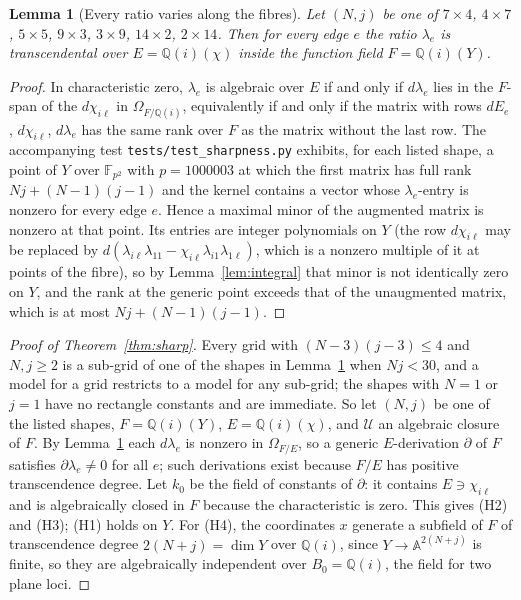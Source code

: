 \documentclass[11pt]{article}
\newtheorem{lemma}{Lemma}
\theoremstyle{remark}
\begin{document}
\begin{lemma}[Every ratio varies along the fibres]
\label{lem:vary}
Let $(N,j)$ be one of $7\times4$, $4\times7$, $5\times5$, $9\times3$,
$3\times9$, $14\times2$, $2\times14$. Then for every edge $e$ the
ratio $\lambda_e$ is transcendental over $E=\mathbb Q(i)(\chi)$ inside
the function field $F=\mathbb Q(i)(Y)$.
\end{lemma}
\begin{proof}
In characteristic zero, $\lambda_e$ is algebraic over $E$ if and only
if $d\lambda_e$ lies in the $F$-span of the $d\chi_{i\ell}$ in
$\Omega_{F/\mathbb Q(i)}$, equivalently if and only if the matrix with
rows $dE_e$, $d\chi_{i\ell}$, $d\lambda_e$ has the same rank over $F$
as the matrix without the last row. The accompanying test
\texttt{tests/test\_sharpness.py} exhibits, for each listed shape, a
point of $Y$ over $\mathbb F_{p^2}$ with $p=1000003$ at which the
first matrix has full rank $Nj+(N-1)(j-1)$ and the kernel contains a
vector whose $\lambda_e$-entry is nonzero for every edge $e$. Hence a
maximal minor of the augmented matrix is nonzero at that point. Its
entries are integer polynomials on $Y$ (the row $d\chi_{i\ell}$ may be
replaced by $d(\lambda_{i\ell}\lambda_{11}-\chi_{i\ell}\lambda_{i1}\lambda_{1\ell})$,
which is a nonzero multiple of it at points of the fibre), so by
Lemma~\ref{lem:integral} that minor is not identically zero on $Y$,
and the rank at the generic point exceeds that of the unaugmented
matrix, which is at most $Nj+(N-1)(j-1)$.
\end{proof}

\begin{proof}[Proof of Theorem~\ref{thm:sharp}]
Every grid with $(N-3)(j-3)\le4$ and $N,j\ge2$ is a sub-grid of one of
the shapes in Lemma~\ref{lem:vary} when $Nj<30$, and a model for a
grid restricts to a model for any sub-grid; the shapes with $N=1$ or
$j=1$ have no rectangle constants and are immediate. So let $(N,j)$ be
one of the listed shapes, $F=\mathbb Q(i)(Y)$, $E=\mathbb Q(i)(\chi)$,
and $\mathcal U$ an algebraic closure of $F$. By Lemma~\ref{lem:vary}
each $d\lambda_e$ is nonzero in $\Omega_{F/E}$, so a generic
$E$-derivation $\partial$ of $F$ satisfies $\partial\lambda_e\ne0$ for
all $e$; such derivations exist because $F/E$ has positive
transcendence degree. Let $k_0$ be the field of constants of
$\partial$: it contains $E\ni\chi_{i\ell}$ and is algebraically closed
in $F$ because the characteristic is zero. This gives (H2) and (H3);
(H1) holds on $Y$. For (H4), the coordinates $x$ generate a subfield
of $F$ of transcendence degree $2(N+j)=\dim Y$ over $\mathbb Q(i)$,
since $Y\to\mathbb A^{2(N+j)}$ is finite, so they are algebraically
independent over $B_0=\mathbb Q(i)$, the field for two plane loci.
\end{proof}
\end{document}
